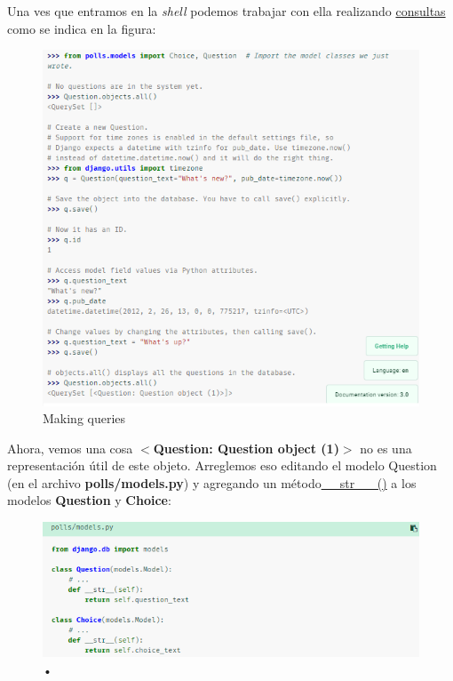 \documentclass[10pt]{article}
\begin{document}
Una ves que entramos en la \textit{shell} podemos trabajar con ella realizando {\href{https://docs.djangoproject.com/en/3.0/topics/db/queries/}{\textcolor{B}{consultas}}} como se indica en la figura:
\begin{figure}[H]
\begin{center}
\renewcommand{\arraystretch}{1.3}
\includegraphics[scale=1.1]{figuras/3/32/324/img1.png}
\caption{Making queries}
\end{center}
\end{figure}


Ahora, vemos una cosa \textbf{$<$Question: Question object (1)$>$} no es una representación útil de este objeto. Arreglemos eso editando el modelo Question (en el archivo \textbf{polls/models.py}) y agregando un método{\href{https://docs.djangoproject.com/en/3.0/ref/models/instances/\#django.db.models.Model.\_\_str\_\_()}{\textcolor{B}{\_\_str \_\_()}}}  a los modelos \textbf{Question} y \textbf{Choice}:
\newpage
\begin{figure}[H]
\begin{center}
\renewcommand{\arraystretch}{1.3}
\includegraphics[scale=1]{figuras/3/32/324/img2.png}
\caption{•}
\end{center}
\end{figure}
\end{document}
